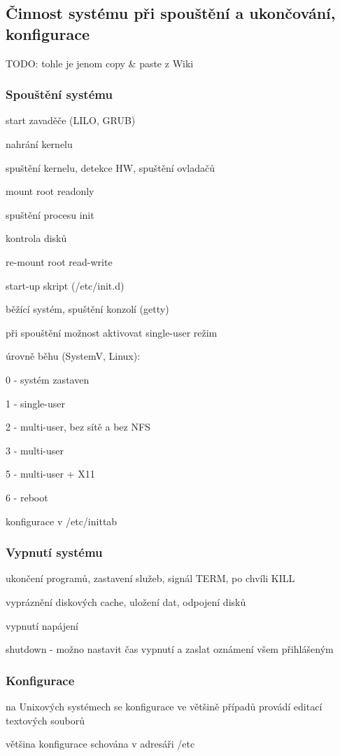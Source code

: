 \subsection{Činnost systému při spouštění a ukončování, konfigurace}

TODO: tohle je jenom copy \& paste z Wiki

\subsubsection*{Spouštění systému}

\begin{pitemize}
  \item start zavaděče (LILO, GRUB)
  \item nahrání kernelu
  \item spuštění kernelu, detekce HW, spuštění ovladačů
  \item mount root readonly
  \item spuštění procesu init
  \item kontrola disků
  \item re-mount root read-write
  \item start-up skript (/etc/init.d)
  \item běžící systém, spuštění konzolí (getty) 
  \item při spouštění možnost aktivovat single-user režim 
  \item úrovně běhu (SystemV, Linux):
  \begin{pitemize}
    \item 0 - systém zastaven
    \item 1 - single-user
    \item 2 - multi-user, bez sítě a bez NFS
    \item 3 - multi-user
    \item 5 - multi-user + X11
    \item 6 - reboot
    \item konfigurace v /etc/inittab 
    \end{pitemize}
\end{pitemize}

\subsubsection*{Vypnutí systému}

\begin{pitemize}
    \item ukončení programů, zastavení služeb, signál TERM, po chvíli KILL
    \item vypráznění diskových cache, uložení dat, odpojení disků
    \item vypnutí napájení
    \item shutdown - možno nastavit čas vypnutí a zaslat oznámení všem přihlášeným 
\end{pitemize}

\subsubsection*{Konfigurace}

\begin{pitemize}
    \item na Unixových systémech se konfigurace ve většině případů provádí editací textových souborů
    \item většina konfigurace schována v adresáři /etc
\end{pitemize}
